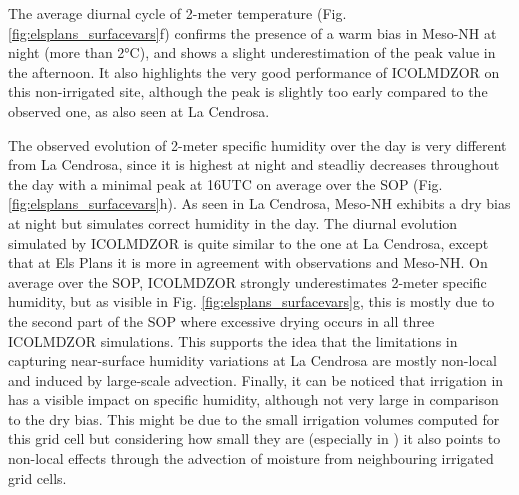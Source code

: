The average diurnal cycle of 2-meter temperature (Fig. \ref{fig:elsplans_surfacevars}f) confirms the presence of a warm bias in Meso-NH at night (more than 2°C), and shows a slight underestimation of the peak value in the afternoon. 
It also highlights the very good performance of ICOLMDZOR on this non-irrigated site, although the peak is slightly too early compared to the observed one, as also seen at La Cendrosa.

The observed evolution of 2-meter specific humidity over the day is very different from La Cendrosa, since it is highest at night and steadliy decreases throughout the day with a minimal peak at 16UTC on average over the SOP (Fig. \ref{fig:elsplans_surfacevars}h).
As seen in La Cendrosa, Meso-NH exhibits a dry bias at night but simulates correct humidity in the day. 
The diurnal evolution simulated by ICOLMDZOR is quite similar to the one at La Cendrosa, except that at Els Plans it is more in agreement with observations and Meso-NH. On average over the SOP, ICOLMDZOR strongly underestimates 2-meter specific humidity, but as visible in Fig. \ref{fig:elsplans_surfacevars}g, this is mostly due to the second part of the SOP where excessive drying occurs in all three ICOLMDZOR simulations. 
This supports the idea that the limitations in capturing near-surface humidity variations at La Cendrosa are mostly non-local and induced by large-scale advection. 
Finally, it can be noticed that irrigation in has a visible impact on specific humidity, although not very large in comparison to the dry bias.
This might be due to the small irrigation volumes computed for this grid cell but considering how small they are (especially in \irr) it also points to non-local effects through the advection of moisture from neighbouring irrigated grid cells.

